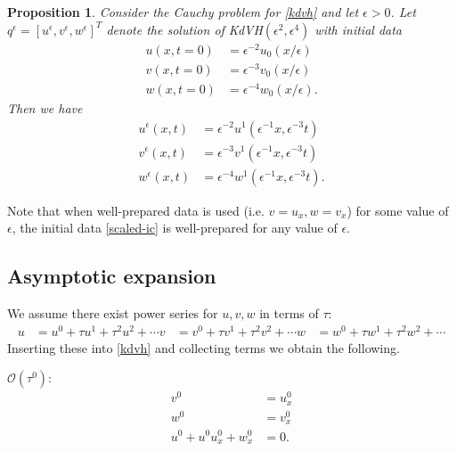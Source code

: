 \documentclass{article}
\theoremstyle{plain}
\newtheorem{proposition}[theorem]{Proposition}
\theoremstyle{definition}
\numberwithin{theorem}{section}
\newcommand{\order}{{\mathcal O}}
\begin{document}
\begin{proposition}\label{prop:scaling}
Consider the Cauchy problem for \eqref{kdvh} and let $\epsilon>0$.
Let $q^\epsilon=[u^\epsilon,v^\epsilon,w^\epsilon]^T$ denote the
solution of KdVH$(\epsilon^2,\epsilon^4)$ with initial data
\begin{subequations} \label{scaled-ic}
\begin{align}
    u(x,t=0) & = \epsilon^{-2} u_0(x/\epsilon) \\
    v(x,t=0) & = \epsilon^{-3} v_0(x/\epsilon) \\
    w(x,t=0) & = \epsilon^{-4} w_0(x/\epsilon).
\end{align}
\end{subequations}
Then we have
\begin{subequations}
\begin{align}
    u^{\epsilon}(x,t) & = \epsilon^{-2} u^1(\epsilon^{-1} x, \epsilon^{-3} t) \\
    v^{\epsilon}(x,t) & = \epsilon^{-3} v^1(\epsilon^{-1} x, \epsilon^{-3} t) \\
    w^{\epsilon}(x,t) & = \epsilon^{-4} w^1(\epsilon^{-1} x, \epsilon^{-3} t).
\end{align}
\end{subequations}
\end{proposition}
Note that when well-prepared data is used (i.e. $v=u_x, w = v_x$) for some value of
$\epsilon$, the initial data \eqref{scaled-ic} is well-prepared for any value of $\epsilon$.

\subsection{Asymptotic expansion}
We assume there exist power series for $u, v, w$ in terms of $\tau$:
\begin{align}
    u & = u^0 + \tau u^1 + \tau^2 u^2 + \cdots
    v & = v^0 + \tau v^1 + \tau^2 v^2 + \cdots
    w & = w^0 + \tau w^1 + \tau^2 w^2 + \cdots
\end{align}
Inserting these into \eqref{kdvh} and collecting terms we obtain the following.

$\order(\tau^0)$:
\begin{subequations}
\begin{align}
    v^0 & = u^0_x \\
    w^0 & = v^0_x \\
    u^0 + u^0 u^0_x + w^0_x & = 0.
\end{align}
\end{subequations}
\end{document}
